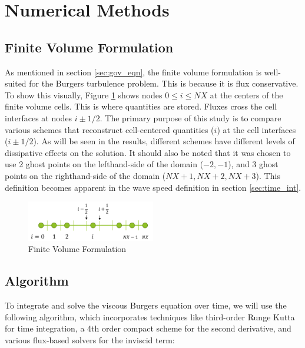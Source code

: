 \documentclass[conf]{new-aiaa}
\begin{document}
\section{Numerical Methods} \label{sec:numerical}

\subsection{Finite Volume Formulation}

As mentioned in section \ref{sec:gov_eqn}, the finite volume formulation is
well-suited for the Burgers turbulence problem. This is because it is flux
conservative. To show this visually, Figure \ref{fig:finite_volume} shows nodes
$0 \le i \le NX$ at the centers of the finite volume cells. This is where
quantities are stored. Fluxes cross the cell interfaces at nodes $i\pm1/2$. The
primary purpose of this study is to compare various schemes that reconstruct
cell-centered quantities ($i$) at the cell interfaces ($i\pm1/2$). As will be
seen in the results, different schemes have different levels of dissipative
effects on the solution. It should also be noted that it was chosen to use 2
ghost points on the lefthand-side of the domain ($-2, -1$), and 3 ghost points
on the righthand-side of the domain ($NX+1, NX+2, NX+3$). This definition
becomes apparent in the wave speed definition in section \ref{sec:time_int}.

\begin{figure}[hbt!]
	\centering
	\includegraphics[width=0.5\textwidth]{figures/Finite_Volume.png}
	\caption{Finite Volume Formulation}
	\label{fig:finite_volume}
\end{figure}

\subsection{Algorithm}

To integrate and solve the viscous Burgers equation over time, we will use the
following algorithm, which incorporates techniques like third-order Runge Kutta
for time integration, a 4th order compact scheme for the second
derivative, and various flux-based solvers for the inviscid term:
\end{document}
